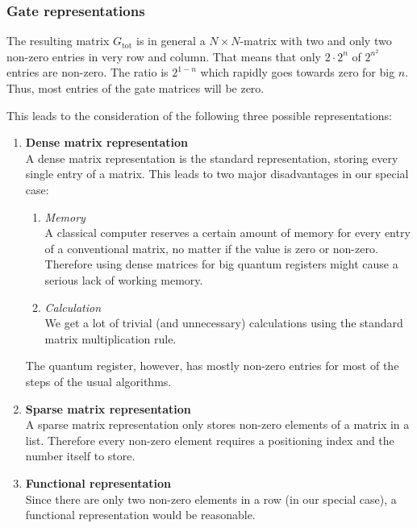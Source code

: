 \documentclass[bibliography=totocnumbered]{article}
\theoremstyle{NoticeStyle}
\begin{document}
\subsubsection{Gate representations}
The resulting matrix $G_\text{tot}$ is in general a $N \times N$-matrix with two and only two non-zero entries in very row and column. That means that only $2\cdot 2^n$ of $2^{n^2}$ entries are non-zero. The ratio is $2^{1-n}$ which rapidly goes towards zero for big $n$. Thus, most entries of the gate matrices will be zero.

This leads to the consideration of the following three possible representations:
\begin{enumerate}
	\item \textbf{Dense matrix representation}\\
		A dense matrix representation is the standard representation, storing every single entry of a matrix. This leads to two major disadvantages in our special case:		
		\begin{enumerate}
			\item \textit{Memory}\\
			A classical computer reserves a certain amount of memory for every entry of a conventional matrix, no matter if the value is zero or non-zero. Therefore using dense matrices for big quantum registers might cause a serious lack of working memory.
			\item \textit{Calculation}\\
			We get a lot of trivial (and unnecessary) calculations using the standard matrix multiplication rule.
		\end{enumerate}
		The quantum register, however, has mostly non-zero entries for most of the steps of the usual algorithms.
	\item \textbf{Sparse matrix representation}\\
		A sparse matrix representation only stores non-zero elements of a matrix in a list. Therefore every non-zero element requires a positioning index and the number itself to store. 
	\item \textbf{Functional representation}\\
		Since there are only two non-zero elements in a row (in our special case), a functional representation would be reasonable.
\end{enumerate}



\end{document}
